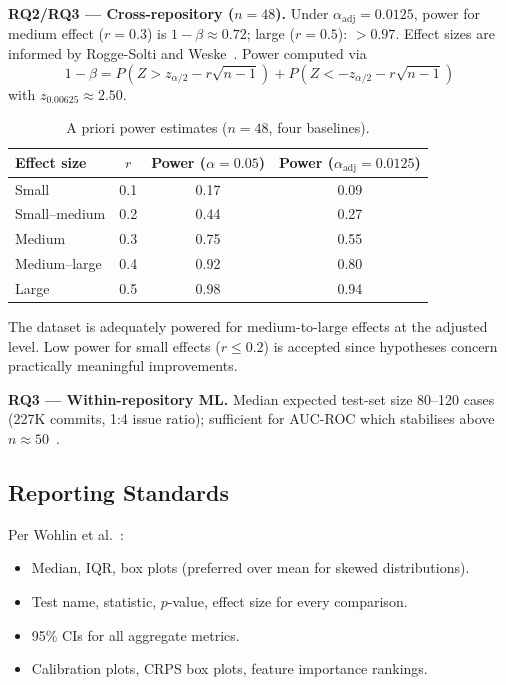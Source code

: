 \textbf{RQ2/RQ3 — Cross-repository ($n=48$).} Under
$\alpha_{\text{adj}} = 0.0125$, power for medium effect ($r = 0.3$) is
$1-\beta \approx 0.72$; large ($r = 0.5$): $> 0.97$. Effect sizes are
informed by Rogge-Solti and
Weske~\cite{RoggeSolti2015NonMarkovianSPN}. Power computed via
\begin{equation}
\label{eq:power}
1 - \beta = P(Z > z_{\alpha/2} - r\sqrt{n-1})
    + P(Z < -z_{\alpha/2} - r\sqrt{n-1})
\end{equation}
with $z_{0.00625} \approx 2.50$.

\begin{table}[htbp]
\centering
\caption{A priori power estimates ($n = 48$, four baselines).}
\label{tab:power-analysis}
\small
\begin{tabular}{lccc}
\toprule
\textbf{Effect size} & \textbf{$r$} &
  \textbf{Power ($\alpha = 0.05$)} &
  \textbf{Power ($\alpha_{\text{adj}} = 0.0125$)} \\
\midrule
Small         & 0.1 & 0.17 & 0.09 \\
Small--medium & 0.2 & 0.44 & 0.27 \\
Medium        & 0.3 & 0.75 & 0.55 \\
Medium--large & 0.4 & 0.92 & 0.80 \\
Large         & 0.5 & 0.98 & 0.94 \\
\bottomrule
\end{tabular}
\end{table}

The dataset is adequately powered for medium-to-large effects at the
adjusted level. Low power for small effects ($r \leq 0.2$) is accepted
since hypotheses concern practically meaningful improvements.

\textbf{RQ3 — Within-repository ML.} Median expected test-set size
80--120 cases (227K commits, 1:4 issue ratio); sufficient for AUC-ROC
which stabilises above $n \approx 50$~\cite{hanley1982meaning}.


\subsection{Reporting Standards}
\label{sec:reporting}

Per Wohlin et al.~\cite{wohlin2012experimentation}:
\begin{itemize}
    \item Median, IQR, box plots (preferred over mean for skewed
    distributions).
    \item Test name, statistic, $p$-value, effect size for every
    comparison.
    \item 95\% CIs for all aggregate metrics.
    \item Calibration plots, CRPS box plots, feature importance rankings.
\end{itemize}


